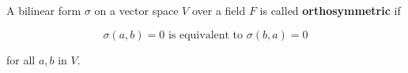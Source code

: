 A bilinear form $\sigma$ on a vector space $V$ over a field $F$ is called \textbf{orthosymmetric} if

$$\sigma(a, b) = 0 \text{ is equivalent to } \sigma(b, a) = 0$$

for all $a, b$ in $V$.
